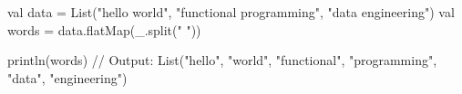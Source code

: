 val data = List("hello world", "functional programming", "data engineering")
val words = data.flatMap(_.split(" "))

println(words) // Output: List("hello", "world", "functional", "programming", "data", "engineering")